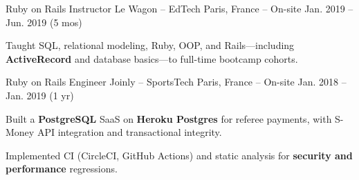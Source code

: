 \begin{cventries}
\cventry
  {Ruby on Rails Instructor}
  {Le Wagon – EdTech}
  {Paris, France – On-site}
  {Jan. 2019 – Jun. 2019 (5 mos)}
  {
    \begin{cvitems}
      \item {Taught SQL, relational modeling, Ruby, OOP, and Rails—including \textbf{ActiveRecord} and database basics—to full-time bootcamp cohorts.}
    \end{cvitems}
  }

\cventry
  {Ruby on Rails Engineer}
  {Joinly – SportsTech}
  {Paris, France – On-site}
  {Jan. 2018 – Jan. 2019 (1 yr)}
  {
    \begin{cvitems}
      \item {Built a \textbf{PostgreSQL} SaaS on \textbf{Heroku Postgres} for referee payments, with S-Money API integration and transactional integrity.}
      \item {Implemented CI (CircleCI, GitHub Actions) and static analysis for \textbf{security and performance} regressions.}
    \end{cvitems}
  }

\end{cventries}
